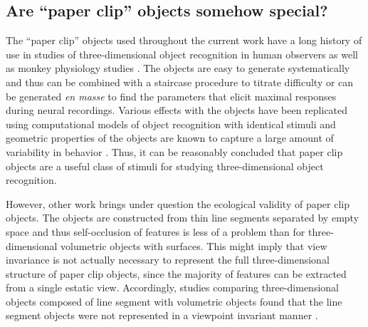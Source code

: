 \documentclass[dwyatte_dissertation.tex]{subfiles}
\begin{document}
\subsection{Are ``paper clip'' objects somehow special?}
The ``paper clip'' objects used throughout the current work have a long history of use in studies of three-dimensional object recognition in human observers \cite{BulthoffEdelman92,EdelmanBulthoff92,SinhaPoggio96} as well as monkey physiology studies \cite{LogothetisPaulsBulthoffEtAl94,LogothetisPaulsPoggio95}. The objects are easy to generate systematically and thus can be combined with a staircase procedure to titrate difficulty or can be generated \textit{en masse} to find the parameters that elicit maximal responses during neural recordings. Various effects with the objects have been replicated using computational models of object recognition with identical stimuli \cite{RiesenhuberPoggio99} and geometric properties of the objects are known to capture a large amount of variability in behavior \cite{BalasSinha09b}. Thus, it can be reasonably concluded that paper clip objects are a useful class of stimuli for studying three-dimensional object recognition.

However, other work brings under question the ecological validity of paper clip objects. The objects are constructed from thin line segments separated by empty space and thus self-occlusion of features is less of a problem than for three-dimensional volumetric objects with surfaces. This might imply that view invariance is not actually necessary to represent the full three-dimensional structure of paper clip objects, since the majority of features can be extracted from a single estatic view. Accordingly, studies comparing three-dimensional objects composed of line segment with volumetric objects found that the line segment objects were not represented in a viewpoint invariant manner \cite{FarahRochlinKlen94,PizloStevenson99}.
\end{document}
